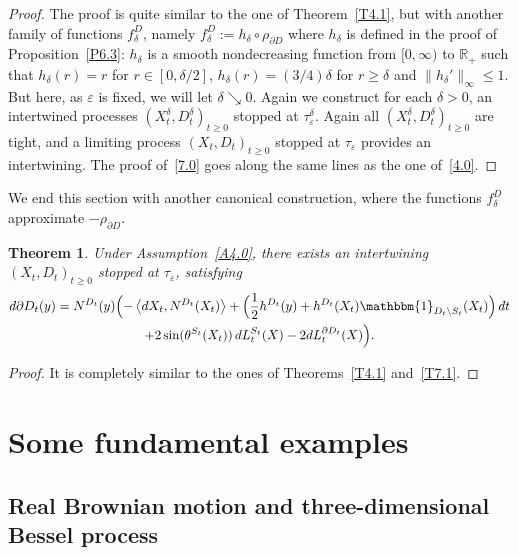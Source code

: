 \documentclass[JEP,XML,SOM,Unicode,NoFloatCountersInSection,published]{cedram}
\let\backslash\setminus
\theoremstyle{plain}
\newtheorem{thm}{Theorem}[section]
\theoremstyle{definition}
\newcommand{\RR}{{\mathbb R}}
\newcommand{\un}{\mathbbm{1}}
\let\f\frac
\let\d\delta
\let\e\varepsilon
\begin{document}
\begin{proof}
The proof is quite similar to the one of Theorem~\ref{T4.1}, but with another family of functions $f_\d^D$, namely $f_\d^D:=h_\d\circ \rho_{\partial D}$ where $h_\d$ is defined in the proof of Proposition~\ref{P6.3}: $h_\d$ is a smooth nondecreasing function from $[0,\infty)$ to $\RR_+$ such that $h_\d(r)=r$ for $r\in [0,\d/2]$, $h_\d(r)=(3/4)\d$ for $r\ge \d$ and $\|h_\d'\|_\infty\le 1$. But here, as $\e$ is fixed, we will let $\d\searrow 0$. Again we construct for
each $\d>0$, an intertwined processes $(X_t^\d,D_t^\d)_{t\ge 0}$ stopped at $\tau_\e^\d$. Again
all $(X_t^\d,D_t^\d)_{t\ge 0}$ are tight, and a limiting process $(X_t,D_t)_{t\ge 0}$ stopped at $\tau_\e$ provides an intertwining. The proof of~\eqref{7.0} goes along the same lines as the one of~\eqref{4.0}.
\end{proof}

We end this section with another canonical construction, where the functions $f_\d^D$ approximate $-\rho_{\partial D}$.
\begin{thm}
\label{T7.2}
Under Assumption~\ref{A4.0},
there exists an intertwining $(X_t,D_t)_{t\ge0}$ stopped at $\tau_\e$, satisfying
\begin{multline}
d\partial D_t(y)=N^{D_t}(y)\Bigl(-\left\langle dX_t, N^{D_t}(X_t)\right\rangle +\Bigl(\f12 h^{D_t}(y)+h^{D_t}(X_t) \un_{D_t \backslash S_t}(X_t) \Bigr)\,dt\\
+2\sin(\theta^{S_t}(X_t))\, dL_t^{S_t}(X) -2dL_t^{\partial D_t}(X)\Bigr).
\end{multline}
\end{thm}
\begin{proof}
It is completely similar to the ones of Theorems~\ref{T4.1} and~\ref{T7.1}.
\end{proof}
\section{Some fundamental examples}
\label{Section5}

\subsection{Real Brownian motion and three-dimensional Bessel process}
\label{Subsection5.1}
\end{document}
